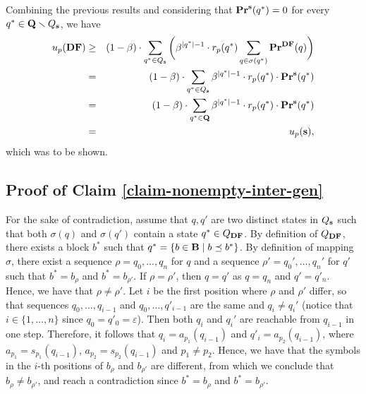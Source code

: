 Combining the previous results and considering that $\mathbf{Pr}^{\mathbf{s}}(q^*) = 0$ for every $q^* \in \mathbf{Q} \smallsetminus Q_{\mathbf{s}}$, we have
\begin{eqnarray*}
u_p(\text{\rm {\bf DF}}) & \geq & (1-\beta) \cdot \sum_{q^* \in Q_{\mathbf{s}}} \bigg(\beta^{|q^*|-1} \cdot r_p(q^*) \sum_{q \in \sigma(q^*)} \mathbf{Pr}^{\text{\rm {\bf DF}}}(q)\bigg)\\
& = &(1-\beta) \cdot \sum_{q^* \in Q_{\mathbf{s}}} \beta^{|q^*|-1} \cdot r_p(q^*) \cdot \mathbf{Pr}^{\mathbf{s}}(q^*)\\
& = &(1-\beta) \cdot \sum_{q^* \in \mathbf{Q}} \beta^{|q^*|-1} \cdot r_p(q^*) \cdot \mathbf{Pr}^{\mathbf{s}}(q^*)\\
& = & u_p(\mathbf{s}), 
\end{eqnarray*}
which was to be shown.



\subsection*{Proof of Claim \ref{claim-nonempty-inter-gen}}

For the sake of contradiction, assume that
$q,q'$ are two distinct states in $Q_{\mathbf{s}}$ such that both $\sigma(q)$ and $\sigma(q')$ contain a state $q^* \in Q_{\text{\rm {\bf DF}}}$. By definition of $Q_{\text{\rm {\bf DF}}}$, there exists a block 
$b^*$ such that $q^* = \{b \in \mathbf{B} \mid b \preceq b^*\}$.
By definition of mapping $\sigma$, there exist a sequence $\rho = q_0,\dots,q_n$ for $q$ and a sequence $\rho' = q_0',\dots,q_n'$ for $q'$ such that $b^* = b_\rho$ and $b^* = b_{\rho'}$. If 
$\rho = \rho'$, then $q = q'$ as $q = q_n$ and $q' = q'_n$. Hence, we have that $\rho \neq \rho'$.
Let $i$ be the first position where $\rho$ and $\rho'$ differ,
so that 
sequences $q_0,\dots,q_{i-1}$ and $q_0,\dots,q'_{i-1}$ are the same and $q_i \neq q_i'$ (notice that $i \in \{1, \ldots, n\}$ since $q_0 = q'_0 = \varepsilon$).
Then both $q_i$ and $q_i'$ are reachable from $q_{i-1}$ in one step. Therefore, it follows that 
$q_i = a_{p_1}(q_{i-1})$ and $q'_i = a_{p_2}(q_{i-1})$, where $a_{p_1} = s_{p_1}(q_{i-1})$, $a_{p_2} = s_{p_2}(q_{i-1})$ and $p_1 \neq p_2$. Hence, we have that the symbols in the $i$-th positions of $b_\rho$ and $b_{\rho'}$ are different, from which we conclude that $b_\rho \neq b_{\rho'}$, and reach a contradiction since $b^* = b_\rho$ and $b^* = b_{\rho'}$.


